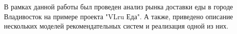 В рамках данной работы был проведен анализ рынка доставки еды в городе Владивосток
на примере проекта "VLru Еда". А также, приведено описание нескольких моделей
рекомендательных систем и реализация одной из них.
